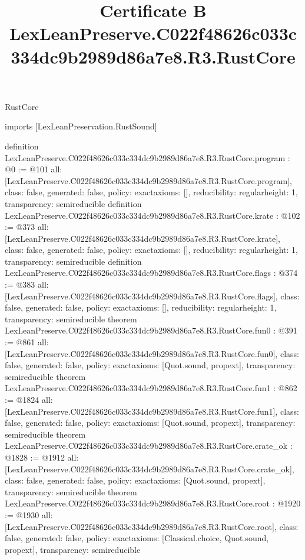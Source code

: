 \begin{lexlean}{RustCore}
\title{Certificate B LexLeanPreserve.C022f48626c033c334dc9b2989d86a7e8.R3.RustCore}
\begin{coremodule}
imports [LexLeanPreservation.RustSound]

definition LexLeanPreserve.C022f48626c033c334dc9b2989d86a7e8.R3.RustCore.program : @0 := @101 {
  all: [LexLeanPreserve.C022f48626c033c334dc9b2989d86a7e8.R3.RustCore.program],
  class: false,
  generated: false,
  policy: exact{axioms: []},
  reducibility: regular{height: 1},
  transparency: semireducible
}
definition LexLeanPreserve.C022f48626c033c334dc9b2989d86a7e8.R3.RustCore.krate : @102 := @373 {
  all: [LexLeanPreserve.C022f48626c033c334dc9b2989d86a7e8.R3.RustCore.krate],
  class: false,
  generated: false,
  policy: exact{axioms: []},
  reducibility: regular{height: 1},
  transparency: semireducible
}
definition LexLeanPreserve.C022f48626c033c334dc9b2989d86a7e8.R3.RustCore.flags : @374 := @383 {
  all: [LexLeanPreserve.C022f48626c033c334dc9b2989d86a7e8.R3.RustCore.flags],
  class: false,
  generated: false,
  policy: exact{axioms: []},
  reducibility: regular{height: 1},
  transparency: semireducible
}
theorem LexLeanPreserve.C022f48626c033c334dc9b2989d86a7e8.R3.RustCore.fun0 : @391 := @861 {
  all: [LexLeanPreserve.C022f48626c033c334dc9b2989d86a7e8.R3.RustCore.fun0],
  class: false,
  generated: false,
  policy: exact{axioms: [Quot.sound, propext]},
  transparency: semireducible
}
theorem LexLeanPreserve.C022f48626c033c334dc9b2989d86a7e8.R3.RustCore.fun1 : @862 := @1824 {
  all: [LexLeanPreserve.C022f48626c033c334dc9b2989d86a7e8.R3.RustCore.fun1],
  class: false,
  generated: false,
  policy: exact{axioms: [Quot.sound, propext]},
  transparency: semireducible
}
theorem LexLeanPreserve.C022f48626c033c334dc9b2989d86a7e8.R3.RustCore.crate_ok : @1828 := @1912 {
  all: [LexLeanPreserve.C022f48626c033c334dc9b2989d86a7e8.R3.RustCore.crate_ok],
  class: false,
  generated: false,
  policy: exact{axioms: [Quot.sound, propext]},
  transparency: semireducible
}
theorem LexLeanPreserve.C022f48626c033c334dc9b2989d86a7e8.R3.RustCore.root : @1920 := @1930 {
  all: [LexLeanPreserve.C022f48626c033c334dc9b2989d86a7e8.R3.RustCore.root],
  class: false,
  generated: false,
  policy: exact{axioms: [Classical.choice, Quot.sound, propext]},
  transparency: semireducible
}


\end{coremodule}
\end{lexlean}

